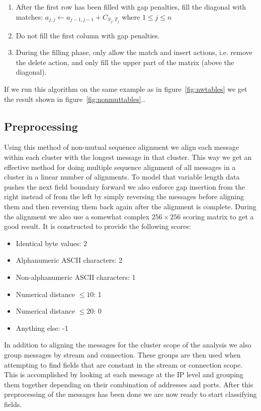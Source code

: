 \documentclass[a4paper]{report}
\begin{document}
\begin{enumerate}
    \item After the first row has been filled with gap penalties, fill the
        diagonal with matches: $a_{j,j} \gets a_{j - 1, j - 1} + C_{S_j,T_j}$
        where $1 \le j \le n$
    \item Do not fill the first column with gap penalties.
    \item During the filling phase, only allow the match and insert actions,
        i.e. remove the delete action, and only fill the upper part of the
        matrix (above the diagonal).
\end{enumerate}

If we run this algorithm on the same example as in figure~\ref{fig:nwtables}
we get the result shown in figure~\ref{fig:nonmuttables}..

\subsection{Preprocessing}
Using this method of non-mutual sequence alignment we align each message within
each cluster with the longest message in that cluster. This way we get an
effective method for doing multiple sequence alignment of all messages in a
cluster in a linear number of alignments. To model that variable length data
pushes the next field boundary forward we also enforce gap insertion from the
right instead of from the left by simply reversing the messages before aligning
them and then reversing them back again after the alignment is complete. During
the alignment we also use a somewhat complex $256 \times 256$ scoring matrix to
get a good result. It is constructed to provide the following scores:

\begin{itemize}
    \item Identical byte values: 2
    \item Alphanumeric ASCII characters: 2
    \item Non-alphanumeric ASCII characters: 1
    \item Numerical distance $\le 10$: 1
    \item Numerical distance $\le 20$: 0
    \item Anything else: -1
\end{itemize}

In addition to aligning the messages for the cluster scope of the analysis we
also group messages by stream and connection. These groups are then used when
attempting to find fields that are constant in the stream or connection scope.
This is accomplished by looking at each message at the IP level and grouping
them together depending on their combination of addresses and ports. After this
preprocessing of the messages has been done we are now ready to start
classifying fields.
\end{document}
